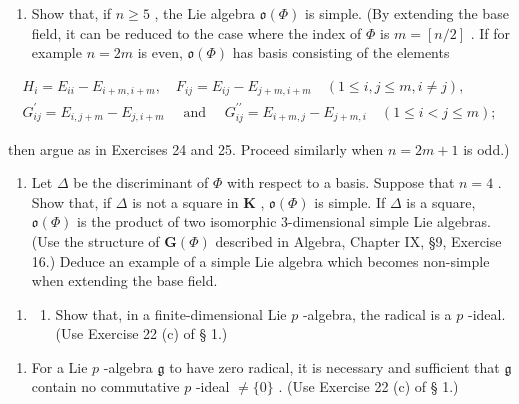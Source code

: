 \begin{enumerate}
\def\labelenumi{(\alph{enumi})}
\tightlist
\item
  Show that, if \(n \geqslant 5\) , the Lie algebra \(\mathfrak{o}(\Phi)\) is simple. (By extending the base field, it can be reduced to the case where the index of \(\Phi\) is \(m = [n/2]\) . If for example \(n = 2m\) is even, \(\mathfrak{o}(\Phi)\) has basis consisting of the elements
\end{enumerate}

\[
\begin{array}{c} H _ {i} = E _ {i i} - E _ {i + m, i + m}, \quad F _ {i j} = E _ {i j} - E _ {j + m, i + m} \quad (1 \leqslant i, j \leqslant m, i \neq j), \\ G _ {i j} ^ {\prime} = E _ {i, j + m} - E _ {j, i + m} \quad \text { and } \quad G _ {i j} ^ {\prime \prime} = E _ {i + m, j} - E _ {j + m, i} \quad (1 \leqslant i <   j \leqslant m); \end{array}
\]

then argue as in Exercises 24 and 25. Proceed similarly when \(n = 2m + 1\) is odd.)

\begin{enumerate}
\def\labelenumi{(\alph{enumi})}
\setcounter{enumi}{1}
\tightlist
\item
  Let \(\Delta\) be the discriminant of \(\Phi\) with respect to a basis. Suppose that \(n = 4\) . Show that, if \(\Delta\) is not a square in \(\mathbf{K}\) , \(\mathfrak{o}(\Phi)\) is simple. If \(\Delta\) is a square, \(\mathfrak{o}(\Phi)\) is the product of two isomorphic 3-dimensional simple Lie algebras. (Use the structure of \(\mathbf{G}(\Phi)\) described in Algebra, Chapter IX, §9, Exercise 16.) Deduce an example of a simple Lie algebra which becomes non-simple when extending the base field.
\end{enumerate}

\begin{enumerate}
\def\labelenumi{\arabic{enumi}.}
\setcounter{enumi}{26}
\tightlist
\item
  \begin{enumerate}
  \def\labelenumii{(\alph{enumii})}
  \tightlist
  \item
    Show that, in a finite-dimensional Lie \(p\) -algebra, the radical is a \(p\) -ideal. (Use Exercise 22 (c) of § 1.)
  \end{enumerate}
\end{enumerate}

\begin{enumerate}
\def\labelenumi{(\alph{enumi})}
\setcounter{enumi}{1}
\tightlist
\item
  For a Lie \(p\) -algebra \(\mathfrak{g}\) to have zero radical, it is necessary and sufficient that \(\mathfrak{g}\) contain no commutative \(p\) -ideal \(\neq \{0\}\) . (Use Exercise 22 (c) of § 1.)
\end{enumerate}

